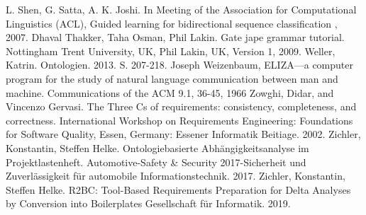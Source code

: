\documentclass[12pt]{report}
\begin{document}
\begin{thebibliography}{20}
 L. Shen, G. Satta, A. K. Joshi. In Meeting of the Association for Computational Linguistics (ACL), \glqq  Guided learning for bidirectional sequence classification\grqq{} , 2007.
Dhaval Thakker, Taha Osman, Phil Lakin. \glqq Gate jape grammar tutorial.\grqq{} Nottingham Trent University, UK, Phil Lakin, UK, Version 1, 2009.
 Weller, Katrin. \glqq Ontologien.\grqq{} 2013. S. 207-218.
Joseph Weizenbaum, \glqq  ELIZA—a computer program for the study of natural language communication between man and machine.\grqq{}  Communications of the ACM 9.1, 36-45, 1966
 Zowghi, Didar, and Vincenzo Gervasi. \glqq The Three Cs of requirements: consistency, completeness, and correctness.\grqq{} International Workshop on Requirements Engineering: Foundations for Software Quality, Essen, Germany: Essener Informatik Beitiage. 2002.
 Zichler, Konstantin, Steffen Helke. \glqq Ontologiebasierte Abhängigkeitsanalyse im Projektlastenheft.\grqq{} Automotive-Safety \& Security 2017-Sicherheit und Zuverlässigkeit für automobile Informationstechnik. 2017.
 Zichler, Konstantin, Steffen Helke. \glqq R2BC: Tool-Based Requirements Preparation for Delta Analyses by Conversion into Boilerplates \grqq{} Gesellschaft für Informatik. 2019.


\end{thebibliography}
\end{document}

